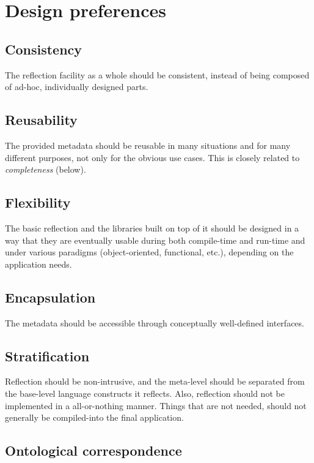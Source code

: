 \section{Design preferences}


\subsection{Consistency}

The reflection facility as a whole
should be consistent, instead of being composed of ad-hoc, individually
designed parts.

\subsection{Reusability}

The provided metadata should be reusable
in many situations and for many different purposes, not only
for the obvious use cases. This is closely related to {\em completeness} (below).

\subsection{Flexibility}

The basic reflection and the libraries
built on top of it should be designed
in a way that they are eventually usable during both compile-time
and run-time and under various paradigms (object-oriented, functional, etc.),
depending on the application needs.

\subsection{Encapsulation}

The metadata should be accessible
through conceptually well-defined interfaces.

\subsection{Stratification}

Reflection should be non-intrusive,
and the meta-level should be separated from the base-level language
constructs it reflects. Also, reflection should not be implemented
in a all-or-nothing manner. Things that are not needed, should not generally
be compiled-into the final application.

\subsection{Ontological correspondence}

